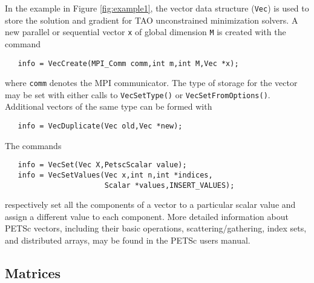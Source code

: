 In the example in Figure \ref{fig:example1}, the vector data structure
(\texttt{Vec}) is used to store the solution and gradient for TAO
unconstrained minimization solvers.  A new parallel or sequential
vector \texttt{x} of global dimension \texttt{M} is created with the
command %
\begin{verbatim}
   info = VecCreate(MPI_Comm comm,int m,int M,Vec *x);
\end{verbatim}
\noindent
where \texttt{comm} denotes the MPI communicator. The type of storage
for the vector may be set with either calls to \texttt{VecSetType()}
or \texttt{VecSetFromOptions()}.  Additional vectors of the same type
can be formed with %
\begin{verbatim}
   info = VecDuplicate(Vec old,Vec *new);
\end{verbatim}
\noindent
The commands %
\begin{verbatim}
   info = VecSet(Vec X,PetscScalar value);
   info = VecSetValues(Vec x,int n,int *indices,
                       Scalar *values,INSERT_VALUES);
\end{verbatim}
\noindent
respectively set all the components of a vector to a particular scalar
value and assign a different value to each component.  More detailed
information about PETSc vectors, including their basic operations,
scattering/gathering, index sets, and distributed arrays, may be found
in the PETSc users manual.

\subsection*{Matrices}

